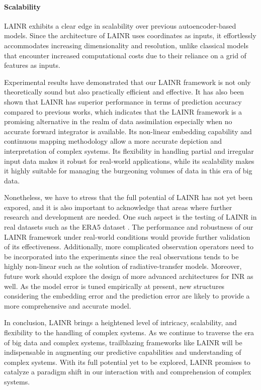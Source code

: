 \documentclass{article}
\begin{document}
\paragraph{Scalability}
LAINR exhibits a clear edge in scalability over previous autoencoder-based models. Since the architecture of LAINR uses coordinates as inputs, it effortlessly accommodates increasing dimensionality and resolution, unlike classical models that encounter increased computational costs due to their reliance on a grid of features as inputs.

Experimental results have demonstrated that our LAINR framework is not only theoretically sound but also practically efficient and effective. It has also been shown that LAINR has superior performance in terms of prediction accuracy compared to previous works, which indicates that the LAINR framework is a promising alternative in the realm of data assimilation especially when no accurate forward integrator is available. Its non-linear embedding capability and continuous mapping methodology allow a more accurate depiction and interpretation of complex systems. Its flexibility in handling partial and irregular input data makes it robust for real-world applications, while its scalability makes it highly suitable for managing the burgeoning volumes of data in this era of big data.

Nonetheless, we have to stress that the full potential of LAINR has not yet been expored, and it is also important to acknowledge that areas where further research and development are needed. One such aspect is the testing of LAINR in real datasets such as the ERA5 dataset \cite{ERA5}. The performance and robustness of our LAINR framework under real-world conditions would provide further validation of its effectiveness. Additionally, more complicated observation operators need to be incorporated into the experiments since the real observations tends to be highly non-linear such as the solution of radiative-transfer models. Moreover, future work should explore the design of more advanced architectures for INR as well. As the model error is tuned empirically at present, new structures considering the embedding error and the prediction error are likely to provide a more comprehensive and accurate model.

In conclusion, LAINR brings a heightened level of intricacy, scalability, and flexibility to the handling of complex systems. As we continue to traverse the era of big data and complex systems, trailblazing frameworks like LAINR will be indispensable in augmenting our predictive capabilities and understanding of complex systems. With its full potential yet to be explored, LAINR promises to catalyze a paradigm shift in our interaction with and comprehension of complex systems.
\appendix
\end{document}

